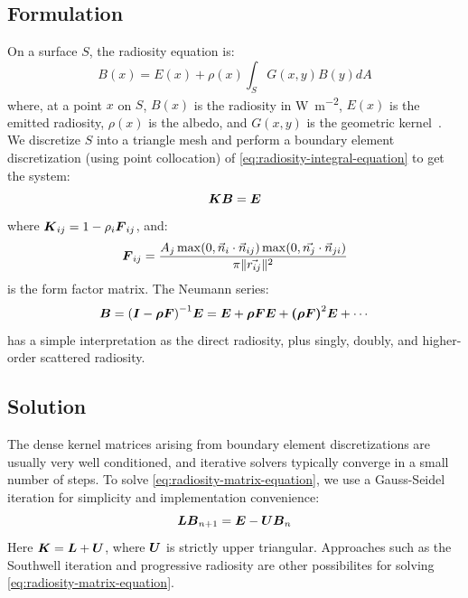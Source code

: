 \documentclass[final,paperwidth=36in,paperheight=45in]{baposter}
\begin{document}
\begin{poster}
  {
    \subsection*{Formulation}

    On a surface $S$, the radiosity equation is:
    \begin{equation}\label{eq:radiosity-integral-equation}
      B(x) = E(x) + \rho(x) \int_S G(x, y) B(y) dA
    \end{equation}
    where, at a point $x$ on $S$, $B(x)$ is the radiosity in
    \si{\watt\per\square\metre}, $E(x)$ is the emitted radiosity,
    $\rho(x)$ is the albedo, and $G(x, y)$ is the geometric
    kernel~\cite{cohen2012radiosity}. We discretize $S$ into a
    triangle mesh and perform a boundary element discretization (using
    point collocation) of \cref{eq:radiosity-integral-equation} to get
    the system:
    \begin{equation}\label{eq:radiosity-matrix-equation}
      \boldsymbol{K} \boldsymbol{B} = \boldsymbol{E}
    \end{equation}
    where $\boldsymbol{K}_{ij} = 1 - \rho_i \boldsymbol{F}_{ij}$, and:
    \begin{equation}
      \boldsymbol{F}_{ij} = \frac{A_j \max(0, \vec{n}_i \cdot \vec{n}_{ij}) \max(0, \vec{n_j} \cdot \vec{n}_{ji})}{\pi \|\vec{r_{ij}}\|^2}
    \end{equation}
    is the form factor matrix. The Neumann series:
    \begin{equation}
      \boldsymbol{B} = {(\boldsymbol{I} - \boldsymbol{\rho} \boldsymbol{F})}^{-1} \boldsymbol{E} = \boldsymbol{E} + \boldsymbol{\rho} \boldsymbol{F} \boldsymbol{E} + \boldsymbol{{(\rho \boldsymbol{F})}}^2 \boldsymbol{E} + \cdots
    \end{equation}
    has a simple interpretation as the direct radiosity, plus singly,
    doubly, and higher-order scattered radiosity.

    \subsection*{Solution}
    
    The dense kernel matrices arising from boundary element
    discretizations are usually very well conditioned, and iterative
    solvers typically converge in a small number of steps. To solve
    \cref{eq:radiosity-matrix-equation}, we use a Gauss-Seidel
    iteration for simplicity and implementation convenience:
    \begin{equation}
      \boldsymbol{L} \boldsymbol{B}_{n+1} = \boldsymbol{E} - \boldsymbol{U} \boldsymbol{B}_n
    \end{equation}
    Here $\boldsymbol{K} = \boldsymbol{L} + \boldsymbol{U}$, where $\boldsymbol{U}$ is strictly
    upper triangular. Approaches such as the Southwell iteration and
    progressive radiosity are other possibilites for solving
    \cref{eq:radiosity-matrix-equation}.

}
\end{poster}
\end{document}
